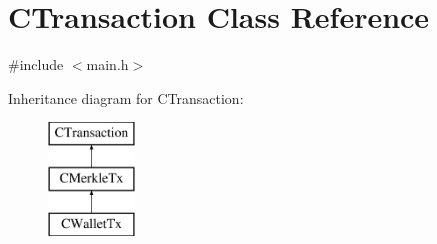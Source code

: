 \hypertarget{class_c_transaction}{}\section{C\+Transaction Class Reference}
\label{class_c_transaction}


{\ttfamily \#include $<$main.\+h$>$}

Inheritance diagram for C\+Transaction\+:\begin{figure}[H]
\begin{center}
\leavevmode
\includegraphics[height=3.000000cm]{class_c_transaction}
\end{center}
\end{figure}
